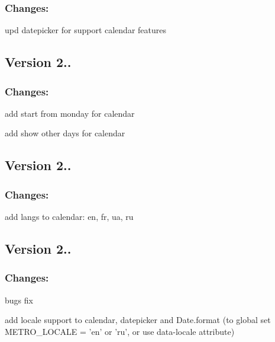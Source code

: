 \subsubsection*{Changes\-:}


\begin{DoxyItemize}
\item upd datepicker for support calendar features
\end{DoxyItemize}

\subsection*{Version 2..}

\subsubsection*{Changes\-:}


\begin{DoxyItemize}
\item add start from monday for calendar
\item add show other days for calendar
\end{DoxyItemize}

\subsection*{Version 2..}

\subsubsection*{Changes\-:}


\begin{DoxyItemize}
\item add langs to calendar\-: en, fr, ua, ru
\end{DoxyItemize}

\subsection*{Version 2..}

\subsubsection*{Changes\-:}


\begin{DoxyItemize}
\item bugs fix
\item add locale support to calendar, datepicker and Date.\-format (to global set M\-E\-T\-R\-O\-\_\-\-L\-O\-C\-A\-L\-E = 'en' or 'ru', or use data-\/locale attribute)
\end{DoxyItemize}

